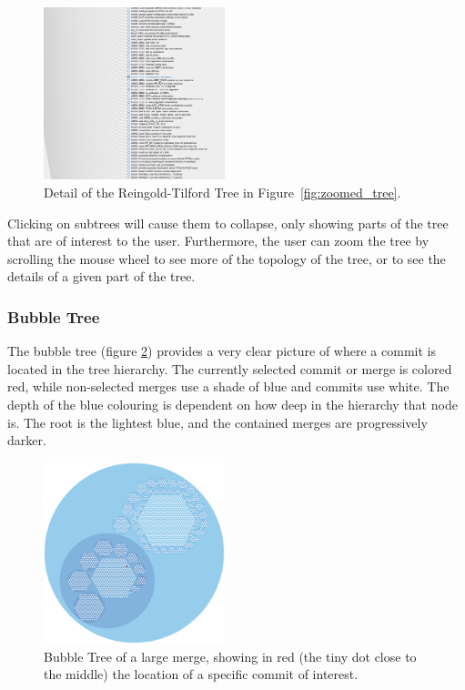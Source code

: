 \documentclass[conference, draftclsnofoot, draft]{IEEEtran}
\begin{document}
\begin{figure}
        \centering
        \includegraphics[width=0.47\textwidth]{figures/tree_view.png}
        \caption{Detail of the Reingold-Tilford Tree in Figure~\ref{fig:zoomed_tree}.}
        \label{fig:tree}
\end{figure}

Clicking on subtrees will cause them to collapse, only showing parts of the tree
that are of interest to the user. Furthermore, the user can zoom the tree by
scrolling the mouse wheel to see more of the topology of the tree, or to see the
details of a given part of the tree.



\subsubsection{Bubble Tree}


The bubble tree (figure \ref{fig:bubble_tree}) provides a very clear picture of
where a commit is located in the tree hierarchy. The currently selected commit or merge
is colored red, while non-selected merges use a shade of blue and commits use white.
The depth of the blue colouring is dependent on how deep in the hierarchy that node
is. The root is the lightest blue, and the contained merges are progressively
darker.

\begin{figure}
        \centering
        \includegraphics[width=0.47\textwidth]{figures/bubble_tree.pdf}
        \caption{Bubble Tree of a large merge, showing in red (the tiny dot close to the middle) the location of a specific commit of interest.}
        \label{fig:bubble_tree}
\end{figure}
\end{document}
